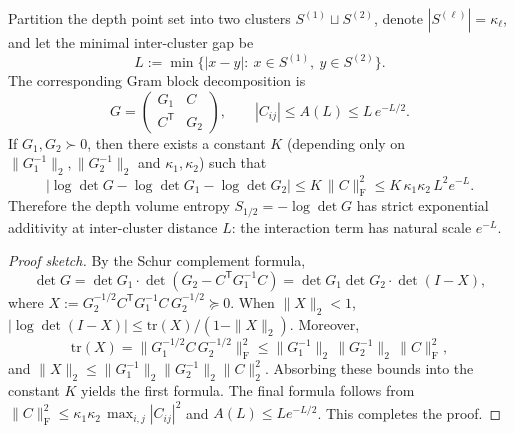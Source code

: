 \begin{proposition}\label{prop:xi-hellinger-gram-cluster-additivity-exp}
Partition the depth point set into two clusters \(S^{(1)}\sqcup S^{(2)}\), denote \(|S^{(\ell)}|=\kappa_\ell\), and let the minimal inter-cluster gap be
\[
L:=\min\{|x-y|:\ x\in S^{(1)},\ y\in S^{(2)}\}.
\]
The corresponding Gram block decomposition is
\[
G=\begin{pmatrix}G_1 & C\\ C^{\mathsf T}& G_2\end{pmatrix},
\qquad
|C_{ij}|\le A(L)\le L\,e^{-L/2}.
\]
If \(G_1,G_2\succ0\), then there exists a constant \(K\) (depending only on \(\|G_1^{-1}\|_2,\|G_2^{-1}\|_2\) and \(\kappa_1,\kappa_2\)) such that
\[
\bigl|\log\det G-\log\det G_1-\log\det G_2\bigr|
\le K\,\|C\|_{\mathrm F}^{2}
\le K\,\kappa_1\kappa_2\,L^{2}e^{-L}.
\]
Therefore the depth volume entropy \(S_{1/2}=-\log\det G\) has strict exponential additivity at inter-cluster distance \(L\): the interaction term has natural scale \(e^{-L}\).
\end{proposition}
\begin{proof}[Proof sketch]
By the Schur complement formula,
\[
\det G=\det G_1\cdot \det(G_2-C^{\mathsf T}G_1^{-1}C)
=\det G_1\det G_2\cdot \det(I-X),
\]
where \(X:=G_2^{-1/2}C^{\mathsf T}G_1^{-1}C\,G_2^{-1/2}\succeq 0\).
When \(\|X\|_2<1\),
\(
|\log\det(I-X)|\le \mathrm{tr}(X)/(1-\|X\|_2)
\).
Moreover,
\[
\mathrm{tr}(X)=\|G_1^{-1/2}C\,G_2^{-1/2}\|_{\mathrm F}^2
\le \|G_1^{-1}\|_2\,\|G_2^{-1}\|_2\,\|C\|_{\mathrm F}^2,
\]
and \(\|X\|_2\le \|G_1^{-1}\|_2\|G_2^{-1}\|_2\|C\|_2^2\).
Absorbing these bounds into the constant \(K\) yields the first formula.
The final formula follows from \(\|C\|_{\mathrm F}^2\le \kappa_1\kappa_2\,\max_{i,j}|C_{ij}|^2\) and \(A(L)\le L e^{-L/2}\). This completes the proof.
\end{proof}
